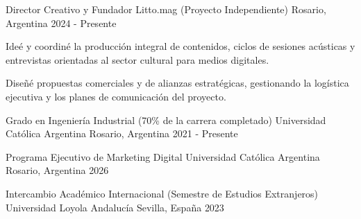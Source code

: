 \documentclass[11pt, a4paper]{awesome-cv}
\begin{document}
\begin{cventries}
  \cventry
    {Director Creativo y Fundador} %
    {Litto.mag (Proyecto Independiente)} %
    {Rosario, Argentina} %
    {2024 - Presente} %
    {
      \begin{cvitems}
        \item {Ideé y coordiné la producción integral de contenidos, ciclos de sesiones acústicas y entrevistas orientadas al sector cultural para medios digitales.}
        \item {Diseñé propuestas comerciales y de alianzas estratégicas, gestionando la logística ejecutiva y los planes de comunicación del proyecto.}
      \end{cvitems}
    }

\end{cventries}



\begin{cventries}

  \cventry
    {Grado en Ingeniería Industrial (70\% de la carrera completado)} %
    {Universidad Católica Argentina} %
    {Rosario, Argentina} %
    {2021 - Presente} %
    {}

  \cventry
    {Programa Ejecutivo de Marketing Digital} %
    {Universidad Católica Argentina} %
    {Rosario, Argentina} %
    {2026} %
    {}

  \cventry
    {Intercambio Académico Internacional (Semestre de Estudios Extranjeros)} %
    {Universidad Loyola Andalucía} %
    {Sevilla, España} %
    {2023} %
    {}

\end{cventries}


\end{document}
